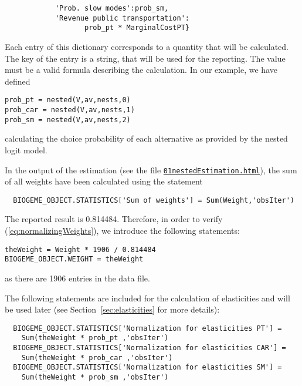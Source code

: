 \documentclass[12pt,a4paper]{article}
\newcommand{\req}[1]{(\ref{#1})}
\begin{document}
\begin{enumerate}
\begin{lstlisting}
            'Prob. slow modes':prob_sm,
            'Revenue public transportation':
                   prob_pt * MarginalCostPT}
\end{lstlisting}
Each entry of this dictionary corresponds to a quantity that will be
calculated. The key of the entry is a string, that will be used for
the reporting. The value must be a valid formula describing the
calculation. In our example, we have defined
\begin{lstlisting}
prob_pt = nested(V,av,nests,0)
prob_car = nested(V,av,nests,1)
prob_sm = nested(V,av,nests,2)
\end{lstlisting}
calculating the choice probability of each alternative as provided by
the nested logit model.
  \end{enumerate}

In the output of the estimation (see the file
\href{http://biogeme.epfl.ch/examples/indicators/python/01nestedEstimation.html}{\lstinline$01nestedEstimation.html$}), the sum of all weights have been
calculated using the statement
\begin{lstlisting}
  BIOGEME_OBJECT.STATISTICS['Sum of weights'] = Sum(Weight,'obsIter')
\end{lstlisting}
The reported result is 0.814484. Therefore, in order to verify
\req{eq:normalizingWeights}, we introduce the following statements:
\begin{lstlisting}
theWeight = Weight * 1906 / 0.814484
BIOGEME_OBJECT.WEIGHT = theWeight
\end{lstlisting}
as there are 1906 entries in the data file.

The following statements are included for the calculation of
elasticities and will be used later (see Section~\ref{sec:elasticities} for more details):
\begin{lstlisting}
  BIOGEME_OBJECT.STATISTICS['Normalization for elasticities PT'] = 
    Sum(theWeight * prob_pt ,'obsIter')
  BIOGEME_OBJECT.STATISTICS['Normalization for elasticities CAR'] =
    Sum(theWeight * prob_car ,'obsIter')
  BIOGEME_OBJECT.STATISTICS['Normalization for elasticities SM'] =
    Sum(theWeight * prob_sm ,'obsIter')
\end{lstlisting}
\end{document}
